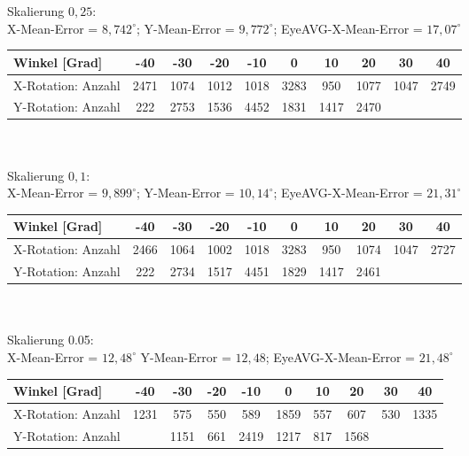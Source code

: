 Skalierung $0,25$:\\
X-Mean-Error = $8,742^\circ$; Y-Mean-Error = $9,772^\circ$; EyeAVG-X-Mean-Error = $17,07^\circ$\\
\begin{tabular}{|l|c|c|c|c|c|c|c|c|c|}
\hline 
Winkel [Grad]&-40&-30&-20&-10&0&10&20&30&40\\
\hline 
X-Rotation: Anzahl&2471&1074&1012&1018&3283&950&1077&1047&2749\\ 
\hline 
Y-Rotation: Anzahl&222&2753&1536&4452&1831&1417&2470&&\\
\hline
\end{tabular}\\\\
Skalierung $0,1$:\\
X-Mean-Error = $9,899^\circ$; Y-Mean-Error = $10,14^\circ$; EyeAVG-X-Mean-Error = $21,31^\circ$\\
\begin{tabular}{|l|c|c|c|c|c|c|c|c|c|}
\hline 
Winkel [Grad]&-40&-30&-20&-10&0&10&20&30&40\\
\hline 
X-Rotation: Anzahl&2466&1064&1002&1018&3283&950&1074&1047&2727\\ 
\hline 
Y-Rotation: Anzahl&222&2734&1517&4451&1829&1417&2461&&\\
\hline
\end{tabular}\\\\
Skalierung 0.05:\\
X-Mean-Error = $12,48^\circ$ Y-Mean-Error = $12,48$; EyeAVG-X-Mean-Error = $21,48^\circ$\\
\begin{tabular}{|l|c|c|c|c|c|c|c|c|c|}
\hline 
Winkel [Grad]&-40&-30&-20&-10&0&10&20&30&40\\
\hline 
X-Rotation: Anzahl&1231&575&550&589&1859&557&607&530&1335\\ 
\hline 
Y-Rotation: Anzahl&&1151&661&2419&1217&817&1568&&\\
\hline
\end{tabular}